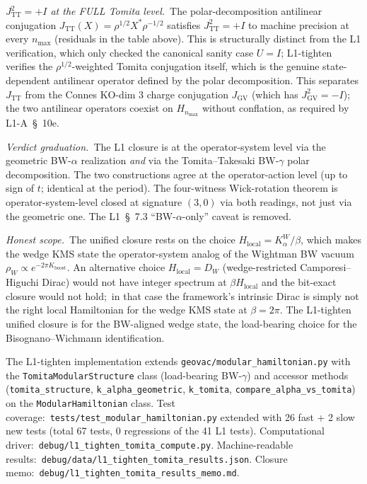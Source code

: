\documentclass[11pt]{article}
\begin{document}
\emph{$J_{\mathrm{TT}}^2 = +I$ at the FULL Tomita level.}\ The
polar-decomposition antilinear conjugation $J_{\mathrm{TT}}(X) =
\rho^{1/2} X^* \rho^{-1/2}$ satisfies $J_{\mathrm{TT}}^2 = +I$ to
machine precision at every $n_{\max}$ (residuals in the table above).
This is structurally distinct from the L1 verification, which only
checked the canonical sanity case $U = I$; L1-tighten verifies the
$\rho^{1/2}$-weighted Tomita conjugation itself, which is the genuine
state-dependent antilinear operator defined by the polar decomposition.
This separates $J_{\mathrm{TT}}$ from the Connes KO-dim 3 charge
conjugation $J_{\mathrm{GV}}$ (which has $J_{\mathrm{GV}}^2 = -I$);
the two antilinear operators coexist on $H_{n_{\max}}$ without
conflation, as required by L1-A~\S~10e.

\emph{Verdict graduation.}\ The L1 closure is at the operator-system
level via the geometric BW-$\alpha$ realization \emph{and} via the
Tomita--Takesaki BW-$\gamma$ polar decomposition.  The two
constructions agree at the operator-action level (up to sign of $t$;
identical at the period).  The four-witness Wick-rotation theorem is
operator-system-level closed at signature $(3, 0)$ via both readings,
not just via the geometric one.  The L1~\S~7.3 ``BW-$\alpha$-only''
caveat is removed.

\emph{Honest scope.}\ The unified closure rests on the choice
$H_{\mathrm{local}} = K_{\alpha}^W / \beta$, which makes the wedge KMS
state the operator-system analog of the Wightman BW vacuum $\rho_W
\propto e^{-2\pi K_{\mathrm{boost}}}$.  An alternative choice
$H_{\mathrm{local}} = D_W$ (wedge-restricted Camporesi--Higuchi Dirac)
would not have integer spectrum at $\beta H_{\mathrm{local}}$ and the
bit-exact closure would not hold;\ in that case the framework's intrinsic
Dirac is simply not the right local Hamiltonian for the wedge KMS state
at $\beta = 2\pi$.  The L1-tighten unified closure is for the
BW-aligned wedge state, the load-bearing choice for the Bisognano--Wichmann
identification.

The L1-tighten implementation extends \verb|geovac/modular_hamiltonian.py|
with the \verb|TomitaModularStructure| class (load-bearing BW-$\gamma$)
and accessor methods (\verb|tomita_structure|, \verb|k_alpha_geometric|,
\verb|k_tomita|, \verb|compare_alpha_vs_tomita|) on the
\verb|ModularHamiltonian| class.  Test coverage:\
\verb|tests/test_modular_hamiltonian.py| extended with 26 fast + 2 slow
new tests (total 67 tests, 0 regressions of the 41 L1 tests).
Computational driver:\ \verb|debug/l1_tighten_tomita_compute.py|.
Machine-readable results:\
\verb|debug/data/l1_tighten_tomita_results.json|.  Closure memo:\
\verb|debug/l1_tighten_tomita_results_memo.md|.
\end{document}
